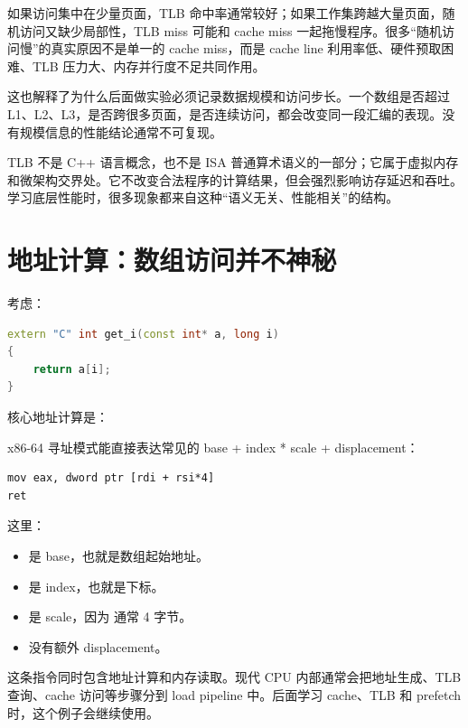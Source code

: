 如果访问集中在少量页面，TLB 命中率通常较好；如果工作集跨越大量页面，随机访问又缺少局部性，TLB miss 可能和 cache miss 一起拖慢程序。很多“随机访问慢”的真实原因不是单一的 cache miss，而是 cache line 利用率低、硬件预取困难、TLB 压力大、内存并行度不足共同作用。

这也解释了为什么后面做实验必须记录数据规模和访问步长。一个数组是否超过 L1、L2、L3，是否跨很多页面，是否连续访问，都会改变同一段汇编的表现。没有规模信息的性能结论通常不可复现。

\begin{deepdive}
TLB 不是 C++ 语言概念，也不是 ISA 普通算术语义的一部分；它属于虚拟内存和微架构交界处。它不改变合法程序的计算结果，但会强烈影响访存延迟和吞吐。学习底层性能时，很多现象都来自这种“语义无关、性能相关”的结构。
\end{deepdive}

\section{地址计算：数组访问并不神秘}

考虑：

\begin{lstlisting}[language=C++]
extern "C" int get_i(const int* a, long i)
{
    return a[i];
}
\end{lstlisting}

核心地址计算是：

\begin{center}
\end{center}

x86-64 寻址模式能直接表达常见的 base + index * scale + displacement：

\begin{lstlisting}
mov eax, dword ptr [rdi + rsi*4]
ret
\end{lstlisting}

这里：

\begin{itemize}
  \item {} 是 base，也就是数组起始地址。
  \item {} 是 index，也就是下标。
  \item {} 是 scale，因为  通常 4 字节。
  \item 没有额外 displacement。
\end{itemize}

这条指令同时包含地址计算和内存读取。现代 CPU 内部通常会把地址生成、TLB 查询、cache 访问等步骤分到 load pipeline 中。后面学习 cache、TLB 和 prefetch 时，这个例子会继续使用。


